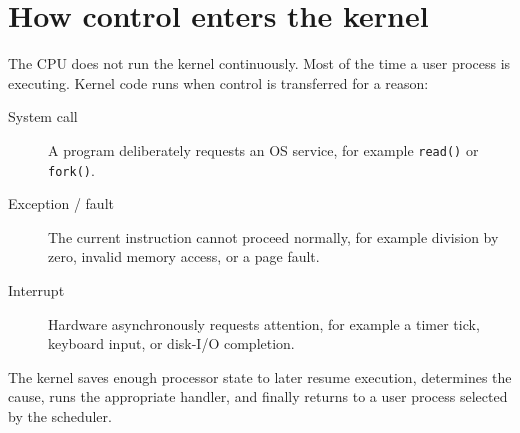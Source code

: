 \section{How control enters the kernel}
The CPU does not run the kernel continuously. Most of the time a user process is executing. Kernel code runs when control is transferred for a reason:
\begin{description}
  \item[System call] A program deliberately requests an OS service, for example \texttt{read()} or \texttt{fork()}.
  \item[Exception / fault] The current instruction cannot proceed normally, for example division by zero, invalid memory access, or a page fault.
  \item[Interrupt] Hardware asynchronously requests attention, for example a timer tick, keyboard input, or disk-I/O completion.
\end{description}
The kernel saves enough processor state to later resume execution, determines the cause, runs the appropriate handler, and finally returns to a user process selected by the scheduler.

\begin{mlfigure}
\end{mlfigure}

